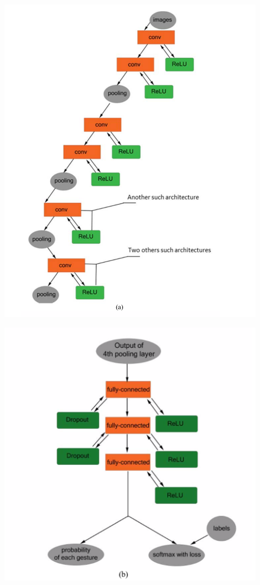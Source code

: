 \documentclass[12pt]{report}
\begin{document}
                \begin{figure}
                    \centering
                    \begin{minipage}{.5\textwidth}
                      \centering
                      \includegraphics[width=.4\linewidth]{./images/tiny_a.png}
                      \label{fig:test1}
                    \end{minipage}%
                    \begin{minipage}{.5\textwidth}
                      \centering
                      \includegraphics[width=.4\linewidth]{./images/tiny_b.png}
                      \label{fig:test2}
                    \end{minipage}
                \end{figure}

    
\end{document}
